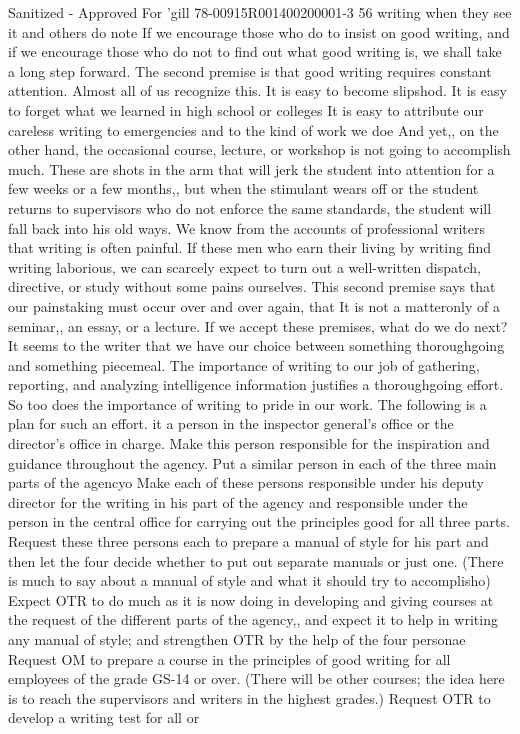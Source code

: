 \documentclass[
    oneside,
    11pt,
    draft
]{memoir}
\begin{document}
Sanitized - Approved For 'gill 78-00915R001400200001-3 56 writing when they see it and others do note If we encourage those who do to insist on good writing, and if we encourage those who do not to find out what good writing is, we shall take a long step forward. The second premise is that good writing requires constant attention. Almost all of us recognize this. It is easy to become slipshod. It is easy to forget what we learned in high school or colleges It is easy to attribute our careless writing to emergencies and to the kind of work we doe And yet,, on the other hand, the occasional course, lecture, or workshop is not going to accomplish much. These are shots in the arm that will jerk the student into attention for a few weeks or a few months,, but when the stimulant wears off or the student returns to supervisors who do not enforce the same standards, the student will fall back into his old ways. We know from the accounts of professional writers that writing is often painful. If these men who earn their living by writing find writing laborious, we can scarcely expect to turn out a well-written dispatch, directive, or study without some pains ourselves. This second premise says that our painstaking must occur over and over again, that It is not a matteronly of a seminar,, an essay, or a lecture. If we accept these premises, what do we do next? It seems to the writer that we have our choice between something thoroughgoing and something piecemeal. The importance of writing to our job of gathering, reporting, and analyzing intelligence information justifies a thoroughgoing effort. So too does the importance of writing to pride in our work. The following is a plan for such an effort. it a person in the inspector general's office or the director's office in charge. Make this person responsible for the inspiration and guidance throughout the agency. Put a similar person in each of the three main parts of the agencyo Make each of these persons responsible under his deputy director for the writing in his part of the agency and responsible under the person in the central office for carrying out the principles good for all three parts. Request these three persons each to prepare a manual of style for his part and then let the four decide whether to put out separate manuals or just one. (There is much to say about a manual of style and what it should try to accomplisho) Expect OTR to do much as it is now doing in developing and giving courses at the request of the different parts of the agency,, and expect it to help in writing any manual of style; and strengthen OTR by the help of the four personae Request OM to prepare a course in the principles of good writing for all employees of the grade GS-14 or over. (There will be other courses; the idea here is to reach the supervisors and writers in the highest grades.) Request OTR to develop a writing test for all or
\end{document}
